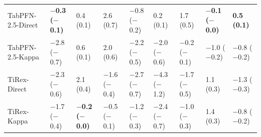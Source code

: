 {\begin{tabular}{lllllllll}
TabPFN-2.5-Direct & \textbf{$-$0.3 ($-$0.1)} & 0.4 (0.1) & 2.6 (0.7) & $-$0.8 ($-$0.2) & 0.2 (0.1) & 1.7 (0.5) & \textbf{$-$0.1 ($-$0.0)} & \textbf{0.5 (0.1)} \\
TabPFN-2.5-Kappa & $-$2.8 ($-$0.7) & 0.6 (0.1) & 2.0 (0.6) & $-$2.2 ($-$0.5) & $-$2.0 ($-$0.6) & $-$0.2 ($-$0.1) & $-$1.0 ($-$0.2) & $-$0.8 ($-$0.2) \\
TiRex-Direct & $-$2.3 ($-$0.6) & 2.1 (0.4) & $-$1.6 ($-$0.4) & $-$2.7 ($-$0.7) & $-$4.3 ($-$1.2) & $-$1.7 ($-$0.5) & 1.1 (0.3) & $-$1.3 ($-$0.3) \\
TiRex-Kappa & $-$1.7 ($-$0.4) & \textbf{$-$0.2 ($-$0.0)} & $-$0.5 ($-$0.1) & $-$1.2 ($-$0.3) & $-$2.4 ($-$0.7) & $-$1.0 ($-$0.3) & 1.4 (0.3) & $-$0.8 ($-$0.2) \\
\bottomrule
\end{tabular}

\vspace{1cm}

}
